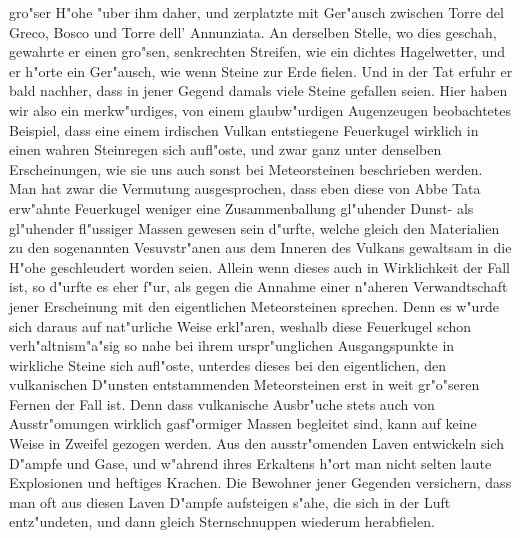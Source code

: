 \documentclass[a4paper, 8pt, oneside, polutonikogreek, german]{article}
\begin{document}
gro"ser H"ohe "uber ihm daher, und zerplatzte mit Ger"ausch zwischen Torre del Greco, Bosco und Torre dell' Annunziata. An derselben Stelle, wo dies geschah, gewahrte er einen gro"sen, senkrechten Streifen, wie ein dichtes Hagelwetter, und er h"orte ein Ger"ausch, wie wenn Steine zur Erde fielen. Und in der Tat erfuhr er bald nachher, dass in jener Gegend damals viele Steine gefallen seien. Hier haben wir also ein merkw"urdiges, von einem glaubw"urdigen Augenzeugen beobachtetes Beispiel, dass eine einem irdischen Vulkan entstiegene Feuerkugel wirklich in einen wahren Steinregen sich aufl"oste, und zwar ganz unter denselben Erscheinungen, wie sie uns auch sonst bei Meteorsteinen beschrieben werden. Man hat zwar die Vermutung ausgesprochen, dass eben diese von Abbe Tata erw"ahnte Feuerkugel weniger eine Zusammenballung gl"uhender Dunst- als gl"uhender fl"ussiger Massen gewesen sein d"urfte, welche gleich den Materialien zu den sogenannten Vesuvstr"anen aus dem Inneren des Vulkans gewaltsam in die H"ohe geschleudert worden seien. Allein wenn dieses auch in Wirklichkeit der Fall ist, so d"urfte es eher f"ur, als gegen die Annahme einer n"aheren Verwandtschaft jener Erscheinung mit den eigentlichen Meteorsteinen sprechen. Denn es w"urde sich daraus auf nat"urliche Weise erkl"aren, weshalb diese Feuerkugel schon verh"altnism"a"sig so nahe bei ihrem urspr"unglichen Ausgangspunkte in wirkliche Steine sich aufl"oste, unterdes dieses bei den eigentlichen, den vulkanischen D"unsten entstammenden Meteorsteinen erst in weit gr"o"seren Fernen der Fall ist. Denn dass vulkanische Ausbr"uche stets auch von Ausstr"omungen wirklich gasf"ormiger Massen begleitet sind, kann auf keine Weise in Zweifel gezogen werden. Aus den ausstr"omenden Laven entwickeln sich D"ampfe und Gase, und w"ahrend ihres Erkaltens h"ort man nicht selten laute Explosionen und heftiges Krachen. Die Bewohner jener Gegenden versichern, dass man oft aus diesen Laven D"ampfe aufsteigen s"ahe, die sich in der Luft entz"undeten, und dann gleich Sternschnuppen wiederum herabfielen.
\end{document}
